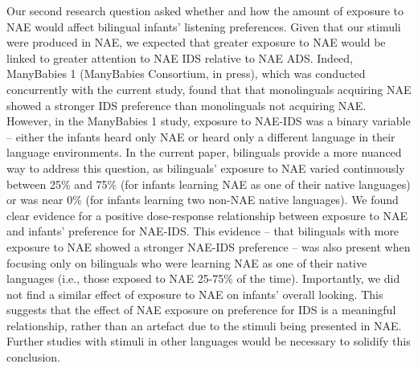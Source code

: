 \documentclass[english,,man,floatsintext]{apa6}
\begin{document}
Our second research question asked whether and how the amount of exposure to NAE would affect bilingual infants' listening preferences. Given that our stimuli were produced in NAE, we expected that greater exposure to NAE would be linked to greater attention to NAE IDS relative to NAE ADS. Indeed, ManyBabies 1 (ManyBabies Consortium, in press), which was conducted concurrently with the current study, found that that monolinguals acquiring NAE showed a stronger IDS preference than monolinguals not acquiring NAE. However, in the ManyBabies 1 study, exposure to NAE-IDS was a binary variable -- either the infants heard only NAE or heard only a different language in their language environments. In the current paper, bilinguals provide a more nuanced way to address this question, as bilinguals' exposure to NAE varied continuously between 25\% and 75\% (for infants learning NAE as one of their native languages) or was near 0\% (for infants learning two non-NAE native languages). We found clear evidence for a positive dose-response relationship between exposure to NAE and infants' preference for NAE-IDS. This evidence -- that bilinguals with more exposure to NAE showed a stronger NAE-IDS preference -- was also present when focusing only on bilinguals who were learning NAE as one of their native languages (i.e., those exposed to NAE 25-75\% of the time). Importantly, we did not find a similar effect of exposure to NAE on infants' overall looking. This suggests that the effect of NAE exposure on preference for IDS is a meaningful relationship, rather than an artefact due to the stimuli being presented in NAE. Further studies with stimuli in other languages would be necessary to solidify this conclusion.
\end{document}
